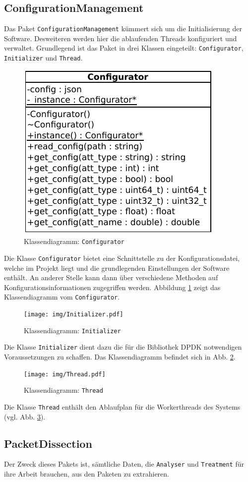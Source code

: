 \documentclass[../review_2.tex]{subfiles}
\begin{document}
\subsection{ConfigurationManagement}
Das Paket \texttt{ConfigurationManagement} kümmert sich um die Initialisierung der Software. Desweiteren werden hier die ablaufenden Threads konfiguriert und verwaltet. Grundlegend ist das Paket in drei Klassen eingeteilt: \texttt{Configurator}, \texttt{Initializer} und \texttt{Thread}. 

\begin{figure}[h]
    \centering
    \includegraphics[width=0.4\linewidth]{img/configurator.pdf}
    \caption{Klassendiagramm: \texttt{Configurator}}
    \label{config}
\end{figure}
Die Klasse \texttt{Configurator} bietet eine Schnittstelle zu der Konfigurationsdatei, welche im Projekt liegt und die grundlegenden Einstellungen der Software enthält. An anderer Stelle kann dann über verschiedene Methoden auf Konfigurationsinformationen zugegriffen werden. Abbildung \ref{config} zeigt das Klassendiagramm vom \texttt{Configurator}.

\begin{figure}[h]
    \centering
    \texttt{[image: img/Initializer.pdf]}
    \caption{Klassendiagramm: \texttt{Initializer}}
    \label{init}
\end{figure}
Die Klasse \texttt{Initializer} dient dazu die für die Bibliothek DPDK notwendigen Voraussetzungen zu schaffen. Das Klassendiagramm befindet sich in Abb. \ref{init}.

\begin{figure}[h]
    \centering
    \texttt{[image: img/Thread.pdf]}
    \caption{Klassendiagramm: \texttt{Thread}}
    \label{thread}
\end{figure}
Die Klasse \texttt{Thread} enthält den Ablaufplan für die Workerthreads des Systems (vgl. Abb. \ref{thread}). 

\subsection{PacketDissection}
Der  Zweck dieses Pakets ist, sämtliche Daten, die \texttt{Analyser} und \texttt{Treatment} für ihre Arbeit brauchen, aus den Paketen zu extrahieren. 
\end{document}

